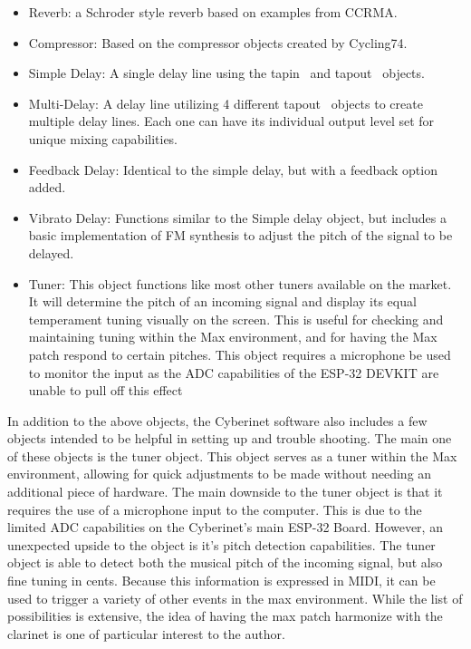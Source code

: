 \begin{itemize}
    \item Reverb: a Schroder style reverb based on examples from CCRMA.
    \item Compressor: Based on the compressor objects created by Cycling74.
    \item Simple Delay: A single delay line using the tapin~ and tapout~ objects. 
    \item Multi-Delay: A delay line utilizing 4 different tapout~ objects to create multiple delay lines. Each one can have its individual output level set for unique mixing capabilities.
    \item Feedback Delay: Identical to the simple delay, but with a feedback option added.
    \item Vibrato Delay: Functions similar to the Simple delay object, but includes a basic implementation of FM synthesis to adjust the pitch of the signal to be delayed. 
    \item Tuner: This object functions like most other tuners available on the market. It will determine the pitch of an incoming signal and display its equal temperament tuning visually on the screen. This is useful for checking and maintaining tuning within the Max environment, and for having the Max patch respond to certain pitches. This object requires a microphone be used to monitor the input as the ADC capabilities of the ESP-32 DEVKIT are unable to pull off this effect
\end{itemize}

In addition to the above objects, the Cyberinet software also includes a few objects intended to be helpful in setting up and trouble shooting. The main one of these objects is the tuner object. This object serves as a tuner within the Max environment, allowing for quick adjustments to be made without needing an additional piece of hardware. 
The main downside to the tuner object is that it requires the use of a microphone input to the computer. This is due to the limited ADC capabilities on the Cyberinet's main ESP-32 Board. However, an unexpected upside to the object is it's pitch detection capabilities. The tuner object is able to detect both the musical pitch of the incoming signal, but also fine tuning in cents. Because this information is expressed in MIDI, it can be used to trigger a variety of other events in the max environment. While the list of possibilities is extensive, the idea of having the max patch harmonize with the clarinet is one of particular interest to the author.

